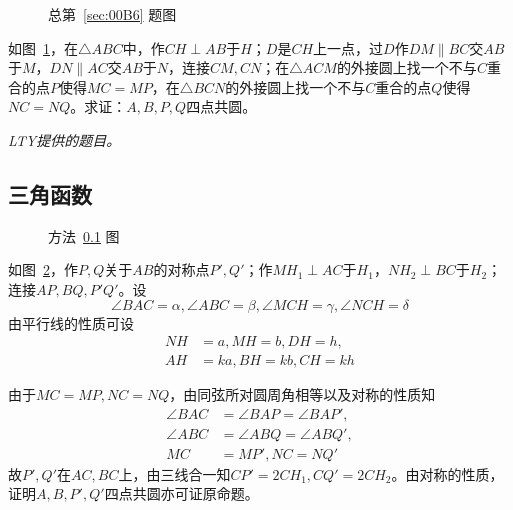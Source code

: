 

\begin{figure}[htbp]
  \centering {}
  \caption{总第~\ref{sec:00B6} 题图} \label{fig:00B6}
\end{figure}

如图~\ref{fig:00B6}，在$\triangle ABC$中，作$CH \perp AB$于$H$；$D$是$CH$上一点，过$D$作$DM \parallel BC$交$AB$于$M$，$DN \parallel AC$交$AB$于$N$，连接$CM, CN$；在$\triangle ACM$的外接圆上找一个不与$C$重合的点$P$使得$MC = MP$，在$\triangle BCN$的外接圆上找一个不与$C$重合的点$Q$使得$NC = NQ$。求证：$A, B, P, Q$四点共圆。

\emph{LTY提供的题目。}

\subsection{三角函数} \label{subsec:00B6-sin}

\begin{figure}[htbp]
  \centering {}
  \caption{方法~\ref{subsec:00B6-sin} 图} \label{fig:00B6-sin}
\end{figure}

如图~\ref{fig:00B6-sin}，作$P, Q$关于$AB$的对称点$P', Q'$；作$MH_1 \perp AC$于$H_1$，$NH_2 \perp BC$于$H_2$；连接$AP, BQ, P'Q'$。设
\[ \angle BAC = \alpha, \angle ABC = \beta, \angle MCH = \gamma, \angle NCH = \delta \]
由平行线的性质可设
\begin{align*}
  NH &= a, MH = b, DH = h, \\
  AH &= ka, BH = kb, CH = kh
\end{align*}

由于$MC = MP, NC = NQ$，由同弦所对圆周角相等以及对称的性质知
\begin{align*}
  \angle BAC &= \angle BAP = \angle BAP', \\
  \angle ABC &= \angle ABQ = \angle ABQ', \\
  MC &= MP', NC = NQ'
\end{align*}
故$P', Q'$在$AC, BC$上，由三线合一知$CP' = 2CH_1, CQ' = 2CH_2$。由对称的性质，证明$A, B, P', Q'$四点共圆亦可证原命题。

